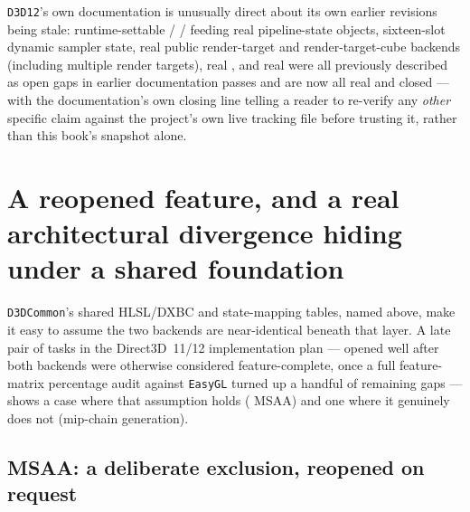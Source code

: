 \texttt{D3D12}'s own documentation is unusually direct about its own earlier revisions being
stale: runtime-settable  / /%
 feeding real pipeline-state objects, sixteen-slot dynamic sampler
state, real public render-target and render-target-cube backends (including multiple render
targets), real , and real  were all
previously described as open gaps in earlier documentation passes and are now all real and
closed --- with the documentation's own closing line telling a reader to re-verify any
\emph{other} specific claim against the project's own live tracking file before trusting it,
rather than this book's snapshot alone.

\section{A reopened feature, and a real architectural divergence hiding under a shared foundation}

\texttt{D3DCommon}'s shared HLSL/DXBC and state-mapping tables, named above, make it easy to
assume the two backends are near-identical beneath that layer. A late pair of tasks in the
Direct3D~11/12 implementation plan --- opened well after both backends were otherwise
considered feature-complete, once a full feature-matrix percentage audit against \texttt{EasyGL}
turned up a handful of remaining gaps --- shows a case where that assumption holds
( MSAA) and one where it genuinely does not (mip-chain generation).

\subsection{ MSAA: a deliberate exclusion, reopened on request}

